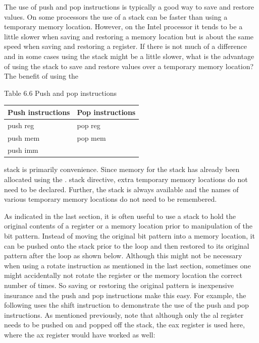\documentclass[10pt]{article}
\begin{document}
The use of push and pop instructions is typically a good way to save and restore values. On some processors the use of a stack can be faster than using a temporary memory location. However, on the Intel processor it tends to be a little slower when saving and restoring a memory location but is about the same speed when saving and restoring a register. If there is not much of a difference and in some cases using the stack might be a little slower, what is the advantage of using the stack to save and restore values over a temporary memory location? The benefit of using the

Table 6.6 Push and pop instructions

\begin{center}
\begin{tabular}{|ll|}
\hline
Push instructions & Pop instructions \\
\hline
push reg & pop reg \\
push mem & pop mem \\
push imm &  \\
\hline
\end{tabular}
\end{center}

stack is primarily convenience. Since memory for the stack has already been allocated using the . stack directive, extra temporary memory locations do not need to be declared. Further, the stack is always available and the names of various temporary memory locations do not need to be remembered.

As indicated in the last section, it is often useful to use a stack to hold the original contents of a register or a memory location prior to manipulation of the bit pattern. Instead of moving the original bit pattern into a memory location, it can be pushed onto the stack prior to the loop and then restored to its original pattern after the loop as shown below. Although this might not be necessary when using a rotate instruction as mentioned in the last section, sometimes one might accidentally not rotate the register or the memory location the correct number of times. So saving or restoring the original pattern is inexpensive insurance and the push and pop instructions make this easy. For example, the following uses the shift instruction to demonstrate the use of the push and pop instructions. As mentioned previously, note that although only the al register needs to be pushed on and popped off the stack, the eax register is used here, where the ax register would have worked as well:
\end{document}
